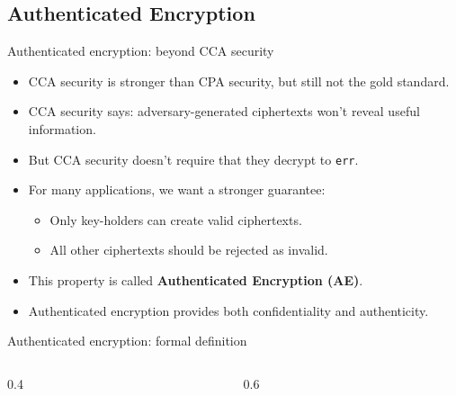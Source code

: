 \ifdefined\PRESENTATION\else\PassOptionsToClass{handout}{beamer}\fi\documentclass[aspectratio=169, lualatex]{beamer}
\begin{document}
\subsection{Authenticated Encryption}

\begin{frame}{Authenticated encryption: beyond CCA security}
	\begin{itemize}[<+->]
		\item CCA security is stronger than CPA security, but still not the gold standard.
		\item CCA security says: adversary-generated ciphertexts won't reveal useful information.
		\item But CCA security doesn't require that they decrypt to \texttt{err}.
		\item For many applications, we want a stronger guarantee:
		      \begin{itemize}
			      \item Only key-holders can create valid ciphertexts.
			      \item All other ciphertexts should be rejected as invalid.
		      \end{itemize}
		\item This property is called \textbf{Authenticated Encryption (AE)}.
		\item Authenticated encryption provides both confidentiality and authenticity.
	\end{itemize}
\end{frame}

\begin{frame}{Authenticated encryption: formal definition}
	\begin{columns}[c]
		\begin{column}{0.4\textwidth}
		\end{column}
		\begin{column}{0.6\textwidth}
			\begin{flushright}
			\end{flushright}
		\end{column}
	\end{columns}
\end{frame}
\end{document}
